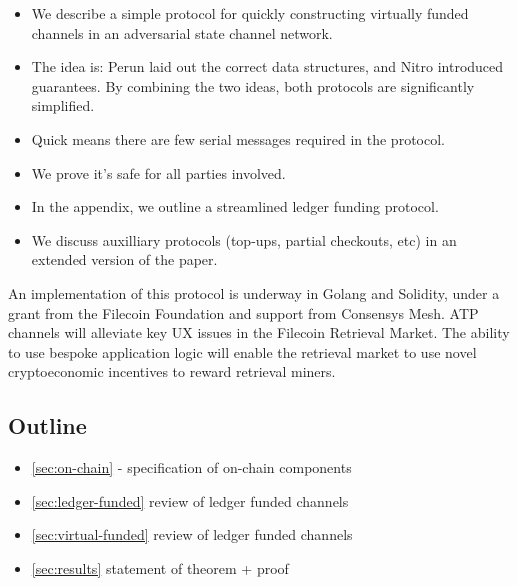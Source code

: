 \begin{itemize}
    \item We describe a simple protocol for quickly constructing virtually funded channels in an adversarial state channel network.
    \item The idea is: Perun laid out the correct data structures, and Nitro introduced guarantees. By combining the two ideas, both protocols are significantly simplified.
    \item Quick means there are few serial messages required in the protocol.
    \item We prove it's safe for all parties involved.
    \item In the appendix, we outline a streamlined ledger funding protocol.
    \item We discuss auxilliary protocols (top-ups, partial checkouts, etc) in an extended version of the paper.
\end{itemize}

An implementation of this protocol is underway in Golang and Solidity, under a grant from the Filecoin Foundation and support from Consensys Mesh.  ATP channels will alleviate key UX issues in the Filecoin Retrieval Market. The ability to use bespoke application logic will enable the retrieval market to use novel cryptoeconomic incentives to reward retrieval miners.

\subsection{Outline}
\begin{itemize}
    \item \ref{sec:on-chain} - specification of on-chain components
    \item \ref{sec:ledger-funded} review of ledger funded channels
    \item \ref{sec:virtual-funded} review of ledger funded channels
    \item \ref{sec:results} statement of theorem + proof
\end{itemize}